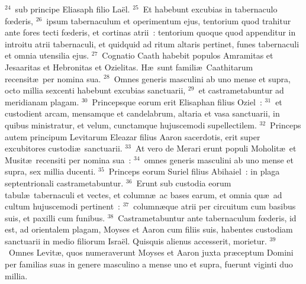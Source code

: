 ${}^{24}$~sub principe Eliasaph filio La\"el.
${}^{25}$~Et habebunt excubias in tabernaculo fœderis,
${}^{26}$~ipsum tabernaculum et operimentum ejus, tentorium quod trahitur ante fores tecti fœderis, et cortinas atrii~: tentorium quoque quod appenditur in introitu atrii tabernaculi, et quidquid ad ritum altaris pertinet, funes tabernaculi et omnia utensilia ejus.
${}^{27}$~Cognatio Caath habebit populos Amramitas et Jesaaritas et Hebronitas et Ozielitas. H\ae\ sunt famili\ae\ Caathitarum recensit\ae\ per nomina sua.
${}^{28}$~Omnes generis masculini ab uno mense et supra, octo millia sexcenti habebunt excubias sanctuarii,
${}^{29}$~et castrametabuntur ad meridianam plagam.
${}^{30}$~Princepsque eorum erit Elisaphan filius Oziel~:
${}^{31}$~et custodient arcam, mensamque et candelabrum, altaria et vasa sanctuarii, in quibus ministratur, et velum, cunctamque hujuscemodi supellectilem.
${}^{32}$~Princeps autem principum Levitarum Eleazar filius Aaron sacerdotis, erit super excubitores custodi\ae\ sanctuarii.
${}^{33}$~At vero de Merari erunt populi Moholit\ae\ et Musit\ae\ recensiti per nomina sua~:
${}^{34}$~omnes generis masculini ab uno mense et supra, sex millia ducenti.
${}^{35}$~Princeps eorum Suriel filius Abihaiel~: in plaga septentrionali castrametabuntur.
${}^{36}$~Erunt sub custodia eorum tabul\ae\ tabernaculi et vectes, et column\ae\ ac bases earum, et omnia qu\ae\ ad cultum hujuscemodi pertinent~:
${}^{37}$~column\ae que atrii per circuitum cum basibus suis, et paxilli cum funibus.
${}^{38}$~Castrametabuntur ante tabernaculum fœderis, id est, ad orientalem plagam, Moyses et Aaron cum filiis suis, habentes custodiam sanctuarii in medio filiorum Isra\"el. Quisquis alienus accesserit, morietur.
${}^{39}$~Omnes Levit\ae , quos numeraverunt Moyses et Aaron juxta pr\ae ceptum Domini per familias suas in genere masculino a mense uno et supra, fuerunt viginti duo millia.


